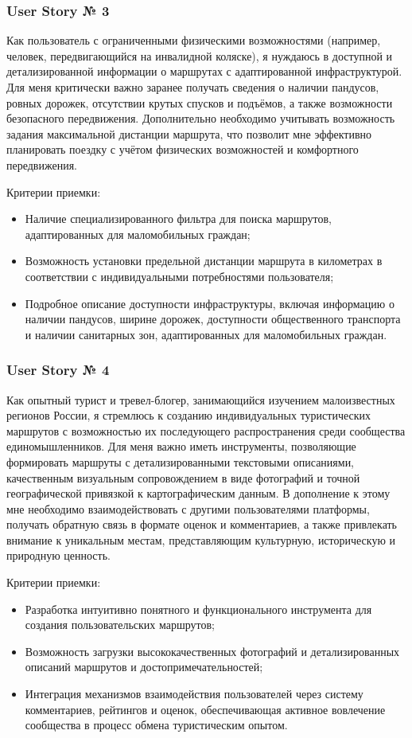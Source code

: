 \subsubsection*{User Story № 3} 
Как пользователь с ограниченными физическими возможностями (например, человек, передвигающийся на инвалидной коляске), я нуждаюсь в доступной и детализированной информации о маршрутах с адаптированной инфраструктурой. Для меня критически важно заранее получать сведения о наличии пандусов, ровных дорожек, отсутствии крутых спусков и подъёмов, а также возможности безопасного передвижения. Дополнительно необходимо учитывать возможность задания максимальной дистанции маршрута, что позволит мне эффективно планировать поездку с учётом физических возможностей и комфортного передвижения.

Критерии приемки:
\begin{itemize}
    \item 	Наличие специализированного фильтра для поиска маршрутов, адаптированных для маломобильных граждан;
    \item 	Возможность установки предельной дистанции маршрута в километрах в соответствии с индивидуальными потребностями пользователя;
    \item 	Подробное описание доступности инфраструктуры, включая информацию о наличии пандусов, ширине дорожек, доступности общественного транспорта и наличии санитарных зон, адаптированных для маломобильных граждан.
\end{itemize}

\subsubsection*{User Story № 4} 
Как опытный турист и тревел-блогер, занимающийся изучением малоизвестных регионов России, я стремлюсь к созданию индивидуальных туристических маршрутов с возможностью их последующего распространения среди сообщества единомышленников. Для меня важно иметь инструменты, позволяющие формировать маршруты с детализированными текстовыми описаниями, качественным визуальным сопровождением в виде фотографий и точной географической привязкой к картографическим данным. В дополнение к этому мне необходимо взаимодействовать с другими пользователями платформы, получать обратную связь в формате оценок и комментариев, а также привлекать внимание к уникальным местам, представляющим культурную, историческую и природную ценность.

Критерии приемки:
\begin{itemize}
    \item 	Разработка интуитивно понятного и функционального инструмента для создания пользовательских маршрутов;
    \item 	Возможность загрузки высококачественных фотографий и детализированных описаний маршрутов и достопримечательностей;
    \item 	Интеграция механизмов взаимодействия пользователей через систему комментариев, рейтингов и оценок, обеспечивающая активное вовлечение сообщества в процесс обмена туристическим опытом.
\end{itemize}

